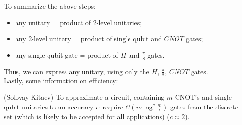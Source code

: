 To summarize the above steps: 
\begin{itemize}
    \item any unitary = product of 2-level unitaries;
    \item any 2-level unitary = product of single qubit and $CNOT$ gates;
    \item any single qubit gate = product of $H$ and $\frac{\pi}{8}$ gates.
\end{itemize}
Thus, we can express any unitary, using only the $H$, $\frac{\pi}{8}$, $CNOT$ gates. \\

Lastly, some information on efficiency:
\begin{theorem} (Solovay-Kitaev)
    To approximate a circuit, containing $m$ CNOT's and single-qubit unitaries to an accuracy $\epsilon$: require $\mathcal{O}(m \log ^c \frac{m}{\epsilon})$ gates from the discrete set (which is likely to be accepted for all applications) ($c \approx 2$).
\end{theorem}
